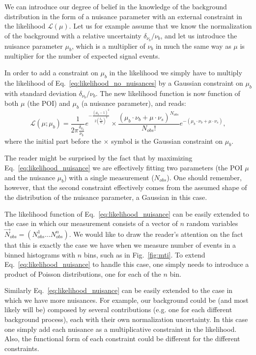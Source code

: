 \documentclass[a4paper,12pt]{article}
\begin{document}
We can introduce our degree of belief in the knowledge of the background
distribution in the form of a nuisance parameter with an external constraint
in the likelihood $\mathcal{L}(\mu)$. Let us for example assume that we know
the normalization of the background with a relative uncertainty
$\delta_{\nu_b}/\nu_b$, and let us introduce the nuisance parameter $\mu_b$,
which is a multiplier of $\nu_b$ in much the same way as $\mu$ is multiplier for the
number of expected signal events. 

In order to add a constraint on $\mu_b$ in the likelihood we simply have to
multiply the likelihood of Eq.~\ref{eq:likelihood_no_nuisances} by a Gaussian
constraint on $\mu_b$ with standard deviation $\delta_{\nu_b}/\nu_b$. The new
likelihood function is now function of both $\mu$ (the POI) and $\mu_b$ (a
nuisance parameter), and reads:
\begin{equation}
\mathcal{L}(\mu;\mu_b)=\frac{1}{2\pi\frac{\delta_{\nu_b}}{\nu_b}}e^{-\frac{(\mu_b-1)^2}{2(\frac{\delta_{\nu_b}}{\nu_b})^2}}\times\frac{(\mu_b\cdot\nu_b+\mu\cdot\nu_s)^{N_{obs}}}{N_{obs}!}e^{-(\mu_b\cdot\nu_b+\mu\cdot\nu_s)},
\label{eq:likelihood_nuisance}
\end{equation}
where the initial part before the $\times$ symbol is the Gaussian constraint
on $\mu_b$.

The reader might be surprised by the fact that by maximizing
Eq.~\ref{eq:likelihood_nuisance} we are effectively fitting two parameters
(the POI $\mu$ and the nuisance $\mu_b$) with a single measurement
($N_{obs}$). One should remember, however, that the second constraint effectively comes from the assumed shape of
the distribution of the nuisance parameter, a Gaussian in this case.

The likelihood function of Eq.~\ref{eq:likelihood_nuisance} can be easily
extended to the case in which our measurement consists of a vector of
$n$ random variables $\vec{N}_{obs}=(N_{obs}^1...N_{obs}^n)$. We would like to draw the
reader's attention on the fact that this is exactly the case we have when we measure number
of events in a binned histograms with $n$ bins, such as in
Fig.~\ref{fig:mti}. To extend Eq.~\ref{eq:likelihood_nuisance} to handle this
case, one simply needs to introduce a product of Poisson distributions, one
for each of the $n$ bin. 

Similarly Eq.~\ref{eq:likelihood_nuisance} can be easily
extended to the case in which we have more nuisances. For example, our
background could be (and most likely will be) composed by several contributions (e.g. one for each different
background process), each with their own normalization uncertainty. In this case one simply add each nuisance as a
multiplicative constraint in the likelihood. Also, the functional form of each constraint could
be different for the different constraints.
\end{document}
